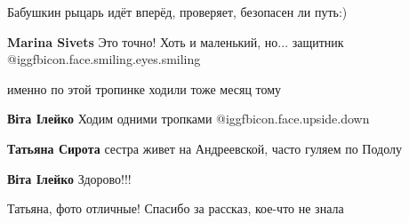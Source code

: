 
 
 
 
 



Бабушкин рыцарь идёт вперёд, проверяет, безопасен ли путь:)

\textbf{Marina Sivets} Это точно! Хоть и маленький, но... защитник @igg{fbicon.face.smiling.eyes.smiling} 

именно по этой тропинке ходили тоже месяц тому

\textbf{Віта Ілейко} Ходим одними тропками @igg{fbicon.face.upside.down} 

\textbf{Татьяна Сирота} сестра живет на Андреевской, часто гуляем по Подолу

\textbf{Віта Ілейко} Здорово!!!

Татьяна, фото отличные! Спасибо за рассказ, кое-что не знала
